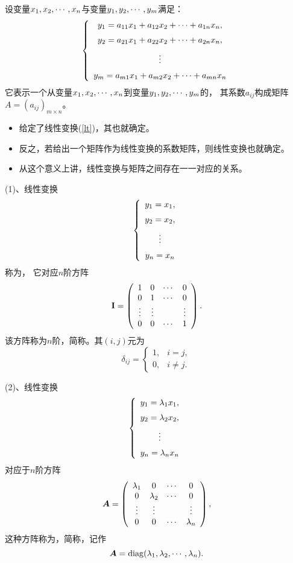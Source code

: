 \begin{li}
  设变量$x_1, x_2, \cdots, x_n$与变量$y_1,y_2,\cdots,y_m$满足：
  \begin{equation}\label{lt}
    \left\{
    \begin{array}{c}
      y_1  = a_{11} x_1 + a_{12} x_2 + \cdots + a_{1n} x_n, \\[0.2cm]
      y_2  = a_{21} x_1 + a_{22} x_2 + \cdots + a_{2n} x_n, \\[0.2cm]
      \vdots \\[0.2cm]
      y_m  = a_{m1} x_1 + a_{m2} x_2 + \cdots + a_{mn} x_n
    \end{array}
    \right.
  \end{equation}
  它表示一个从变量$x_1, x_2, \cdots, x_n$到变量$y_1,y_2,\cdots,y_m$的， 其系数$a_{ij}$构成矩阵$A=(a_{ij})_{m\times n}$。
\end{li}
\begin{itemize}
\item  给定了线性变换(\ref{lt})，其也就确定。 
\item   反之，若给出一个矩阵作为线性变换的系数矩阵，则线性变换也就确定。 
\item   从这个意义上讲，线性变换与矩阵之间存在一一对应的关系。
\end{itemize}      

(1)、线性变换
$$
\left\{
\begin{array}{c}
  y_1 = x_1, \\[0.2cm]
  y_2 = x_2, \\[0.2cm]
  \vdots \\[0.2cm]
  y_n = x_n
\end{array}
\right.
$$
称为， 它对应$n$阶方阵
$$
\mathbf{I} = \left(
\begin{array}{cccc}
  1    & 0    & \cdots  & 0 \\
  0    & 1    & \cdots  & 0 \\
  \vdots  & \vdots  &      & \vdots \\
  0    & 0    & \cdots  & 1
\end{array}
\right). 
$$ 
该方阵称为$n$阶，简称。其$(i,j)$元为
$$
\delta_{ij} = \left \{
\begin{array}{ll}
  1, &i=j, \\
  0, &i\ne j.
\end{array}
\right.  
$$

(2)、线性变换
$$
\left\{
\begin{array}{c}
  y_1 = \lambda_1 x_1, \\[0.2cm]
  y_2 = \lambda_2 x_2, \\[0.2cm]
  \vdots \\[0.2cm]
  y_n = \lambda_n x_n
\end{array}
\right.
$$  
对应于$n$阶方阵
$$
\boldsymbol{A} = \left(
\begin{array}{cccc}
  \lambda_1& 0    & \cdots  & 0 \\
  0    & \lambda_2    & \cdots  & 0 \\
  \vdots  & \vdots  &      & \vdots \\
  0    & 0    & \cdots  & \lambda_n
\end{array}
\right),
$$
这种方阵称为，简称，记作
$$
\boldsymbol{A} = \mathrm{diag}(\lambda_1,\lambda_2,\cdots,\lambda_n).
$$


